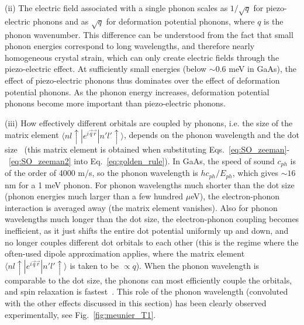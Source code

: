 \documentclass[rmp,twocolumn,aps]{revtex4}
\begin{document}
(ii) The electric field associated with a single phonon scales as
$1/\sqrt{q}$ for piezo-electric phonons and as $\sqrt{q}$ for
deformation potential phonons, where $q$ is the phonon wavenumber.
This difference can be understood from the fact that small phonon
energies correspond to long wavelengths, and therefore nearly
homogeneous crystal strain, which can only create electric fields
through the piezo-electric effect. At sufficiently small energies
(below $\sim 0.6$ meV in GaAs), the effect of piezo-electric
phonons thus dominates over the effect of deformation potential
phonons. As the phonon energy increases, deformation potential
phonons become more important than piezo-electric phonons.

(iii) How effectively different orbitals are coupled by phonons, i.e. the size of the matrix element $\langle n l \uparrow | e^{i\vec{q}\vec{r}} | n' l' \uparrow \rangle$, depends on the phonon wavelength and the dot size~\cite{bockelmann94} (this matrix element is obtained when substituting Eqs.~\ref{eq:SO_zeeman}-~\ref{eq:SO_zeeman2} into
Eq.~\ref{eq:golden_rule}). In GaAs, the speed of sound $c_{ph}$ is
of the order of 4000 m/s, so the phonon wavelength is $h
c_{ph}/E_{ph}$, which gives $\sim 16$ nm for a 1 meV phonon. For
phonon wavelengths much shorter than the dot size (phonon energies
much larger than a few hundred $\mu$eV), the electron-phonon
interaction is averaged away (the matrix element vanishes). Also for phonon wavelengths much longer than the dot size, the electron-phonon coupling becomes inefficient, as it just shifts the entire dot potential uniformly up and down, and no longer couples different dot orbitals to each other (this is the regime where the often-used dipole approximation applies, where the matrix element $\langle n l \uparrow | e^{i\vec{q}\vec{r}} | n' l' \uparrow \rangle$ is taken to be $\propto q$). When the phonon wavelength is comparable to the dot
size, the phonons can most efficiently couple the orbitals, and
spin relaxation is fastest~\cite{woods02,golovach04,bulaev05}. This role of the phonon wavelength (convoluted with the other effects discussed in this section) has been clearly observed experimentally, see Fig.~\ref{fig:meunier_T1}. 
\end{document}
